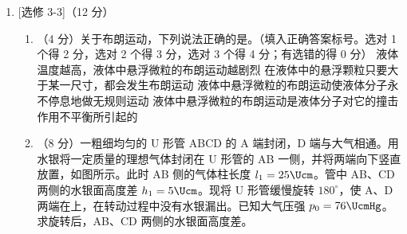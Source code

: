 \documentclass[\gkver]{gaokaozhenti}
\begin{document}
\begin{enumerate}
{（2）由题意可知，b 经两段相等的时间位移为 $x_{0}$；由匀变速直线运动相邻相等时间内位移关系的规律可知 $\frac{x_{1}}{x_{0}}=\frac{1}{4}$，说明当形变量为 $x_{1}=x_{0}-\frac{x_{0}}{4}=\frac{3x_{0}}{4}$ 时二者分离；对 m 分析，因分离时 ab 间没有弹力，则根据牛顿第二定律可知 $kx_{1}-mg\sin\theta=ma$，联立解得 $a=\frac{g\sin\theta}{5}$。

（3）设时间为 $t$，则经时间 $t$ 时，ab 前进的位移 $x=\frac{1}{2}at^{2}=\frac{g\sin\theta t^{2}}{10}$，则形变量变为 $\Delta x=x_{0}-x$，对整体分析可知，由牛顿第二定律有 $F+k\Delta x-\left(m+\frac{3}{5}m\right)g\sin\theta=\left(m+\frac{3}{5}m\right)a$，解得 $F=\frac{8}{25}mg\sin\theta+\frac{4mg^{2}\sin^{2}\theta}{25x_{0}}t^{2}$。因分离时位移 $x=\frac{x_{0}}{4}$，由 $x=\frac{x_{0}}{4}=\frac{1}{2}at^{2}$ 解得 $t=\sqrt{\frac{5x_{0}}{2g\sin\theta}}$，故应保证 $t<\sqrt{\frac{5x_{0}}{2g\sin\theta}}$，$F$ 表达式才能成立。
}

\item
{}[选修 3-3]（12 分）
\begin{enumerate}
	\item
	（4 分）关于布朗运动，下列说法正确的是。（填入正确答案标号。选对 1 个得 2 分，选对 2 个得 3 分，选对 3 个得 4 分；有选错的得 0 分）
	{液体温度越高，液体中悬浮微粒的布朗运动越剧烈}
	{在液体中的悬浮颗粒只要大于某一尺寸，都会发生布朗运动}
	{液体中悬浮微粒的布朗运动使液体分子永不停息地做无规则运动}
	{液体中悬浮微粒的布朗运动是液体分子对它的撞击作用不平衡所引起的}
	\item
	（8 分）一粗细均匀的 U 形管 ABCD 的 A 端封闭，D 端与大气相通。用水银将一定质量的理想气体封闭在 U 形管的 AB 一侧，并将两端向下竖直放置，如图所示。此时 AB 侧的气体柱长度 $l_{1}=25\Ucm$。管中 AB、CD 两侧的水银面高度差 $h_{1}=5\Ucm$。现将 U 形管缓慢旋转 $180^{\circ}$，使 A、D 两端在上，在转动过程中没有水银漏出。已知大气压强 $p_{0}=76\UcmHg$。求旋转后，AB、CD 两侧的水银面高度差。
\end{enumerate}
\end{enumerate}
\end{document}
